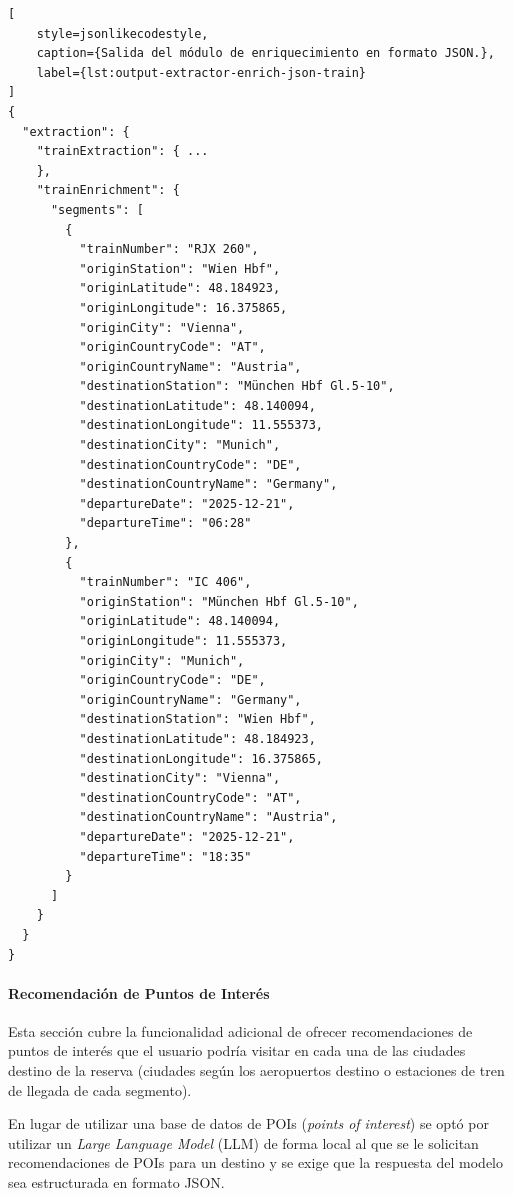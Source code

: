 \begin{lstlisting}[
    style=jsonlikecodestyle,
    caption={Salida del módulo de enriquecimiento en formato JSON.},
    label={lst:output-extractor-enrich-json-train}
]
{
  "extraction": {
    "trainExtraction": { ...
    },
    "trainEnrichment": {
      "segments": [
        {
          "trainNumber": "RJX 260",
          "originStation": "Wien Hbf",
          "originLatitude": 48.184923,
          "originLongitude": 16.375865,
          "originCity": "Vienna",
          "originCountryCode": "AT",
          "originCountryName": "Austria",
          "destinationStation": "München Hbf Gl.5-10",
          "destinationLatitude": 48.140094,
          "destinationLongitude": 11.555373,
          "destinationCity": "Munich",
          "destinationCountryCode": "DE",
          "destinationCountryName": "Germany",
          "departureDate": "2025-12-21",
          "departureTime": "06:28"
        },
        {
          "trainNumber": "IC 406",
          "originStation": "München Hbf Gl.5-10",
          "originLatitude": 48.140094,
          "originLongitude": 11.555373,
          "originCity": "Munich",
          "originCountryCode": "DE",
          "originCountryName": "Germany",
          "destinationStation": "Wien Hbf",
          "destinationLatitude": 48.184923,
          "destinationLongitude": 16.375865,
          "destinationCity": "Vienna",
          "destinationCountryCode": "AT",
          "destinationCountryName": "Austria",
          "departureDate": "2025-12-21",
          "departureTime": "18:35"
        }
      ]
    }
  }
}
\end{lstlisting}

\paragraph{Recomendación de Puntos de Interés}%
\label{par:poi}

Esta sección cubre la funcionalidad adicional de ofrecer recomendaciones de puntos de interés que el usuario podría
visitar en cada una de las ciudades destino de la reserva (ciudades según los aeropuertos destino o estaciones de
tren de llegada de cada segmento).

En lugar de utilizar una base de datos de POIs (\textit{points of interest}) se optó por utilizar un
\textit{Large Language Model} (LLM) de forma local al que se le solicitan recomendaciones de POIs para un destino y se
exige que la respuesta del modelo sea estructurada en formato JSON\@.


